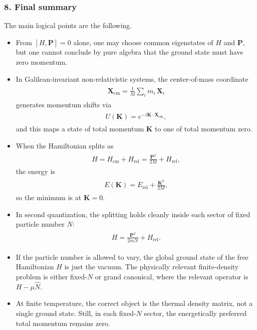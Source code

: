\documentclass[../QFT_main.tex]{subfiles}
\begin{document}
\subsubsection*{8. Final summary}
The main logical points are the following.
\begin{itemize}
    \item From $[H,\mathbf{P}]=0$ alone, one may choose common eigenstates of $H$ and $\mathbf{P}$, but one cannot conclude by pure algebra that the ground state must have zero momentum.
    \item In Galilean-invariant non-relativistic systems, the center-of-mass coordinate
    {\small\begin{align}
    \begin{aligned}
        \mathbf{X}_{\text{cm}}=\frac{1}{M}\sum_i m_i\,\mathbf{X}_i
    \end{aligned}
    \end{align}}
    generates momentum shifts via
    {\small\begin{align}
    \begin{aligned}
        U(\mathbf{K})=e^{-i\mathbf{K}\cdot \mathbf{X}_{\text{cm}}},
    \end{aligned}
    \end{align}}
    and this maps a state of total momentum $\mathbf{K}$ to one of total momentum zero.
    \item When the Hamiltonian splits as
    {\small\begin{align}
    \begin{aligned}
        H=H_{\text{cm}}+H_{\text{rel}}=\frac{\mathbf{P}^2}{2M}+H_{\text{rel}},
    \end{aligned}
    \end{align}}
    the energy is
    {\small\begin{align}
    \begin{aligned}
        E(\mathbf{K})=E_{\text{rel}}+\frac{\mathbf{K}^2}{2M},
    \end{aligned}
    \end{align}}
    so the minimum is at $\mathbf{K}=0$.
    \item In second quantization, the splitting holds cleanly inside each sector of fixed particle number $N$:
    {\small\begin{align}
    \begin{aligned}
        H=\frac{\mathbf{P}^2}{2mN}+H_{\text{rel}}.
    \end{aligned}
    \end{align}}
    \item If the particle number is allowed to vary, the global ground state of the free Hamiltonian $H$ is just the vacuum.
    The physically relevant finite-density problem is either fixed-$N$ or grand canonical, where the relevant operator is $H-\mu\hat N$.
    \item At finite temperature, the correct object is the thermal density matrix, not a single ground state.
    Still, in each fixed-$N$ sector, the energetically preferred total momentum remains zero.
\end{itemize}
\end{document}

